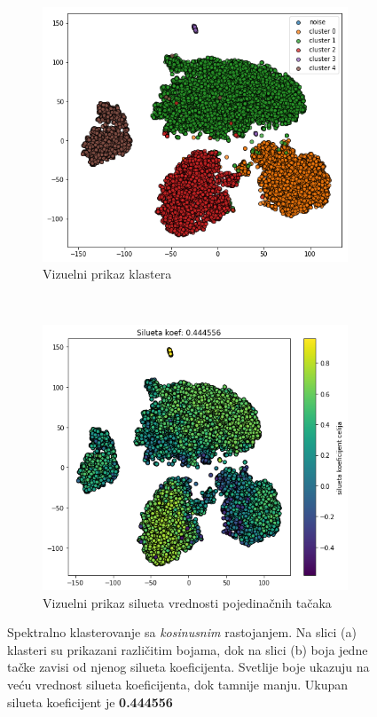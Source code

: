 \documentclass[a4paper]{article}
\begin{document}
\begin{figure}[H]
	\centering

	\begin{subfigure}[normla]{0.5\textwidth}
		\includegraphics[scale=0.3]{spektral_nmf_grp1_cosine}
		\caption{Vizuelni prikaz klastera}
		\label{spektral_nmf_grp1_cosine_A}
	\end{subfigure}
	~
	\begin{subfigure}[normla]{0.4\textwidth}
		\includegraphics[scale=0.3]{spektral_nmf_grp1_cosine_silueta}
		\caption{Vizuelni prikaz silueta vrednosti pojedinačnih tačaka}
		\label{spektral_nmf_grp1_cosine_B}
	\end{subfigure}
		\caption{Spektralno klasterovanje sa \textit{kosinusnim} rastojanjem. Na slici (a) klasteri su prikazani različitim bojama, dok na slici (b) boja jedne tačke zavisi od njenog silueta koeficijenta. Svetlije boje ukazuju na veću vrednost silueta koeficijenta, dok tamnije manju. Ukupan silueta koeficijent je \textbf{0.444556}}
\label{spektral_nmf_grp1_cosine}
\end{figure}
\end{document}
